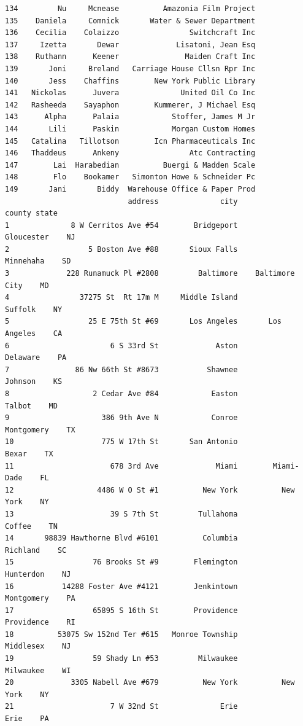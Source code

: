 \documentclass[
  12pt,
]{article}
\begin{document}
\begin{verbatim}
134         Nu     Mcnease          Amazonia Film Project
135    Daniela     Comnick       Water & Sewer Department
136    Cecilia    Colaizzo                Switchcraft Inc
137     Izetta       Dewar             Lisatoni, Jean Esq
138    Ruthann      Keener               Maiden Craft Inc
139       Joni     Breland   Carriage House Cllsn Rpr Inc
140       Jess    Chaffins        New York Public Library
141   Nickolas      Juvera              United Oil Co Inc
142   Rasheeda    Sayaphon        Kummerer, J Michael Esq
143      Alpha      Palaia            Stoffer, James M Jr
144       Lili      Paskin            Morgan Custom Homes
145   Catalina   Tillotson        Icn Pharmaceuticals Inc
146   Thaddeus      Ankeny                Atc Contracting
147        Lai  Harabedian          Buergi & Madden Scale
148        Flo    Bookamer   Simonton Howe & Schneider Pc
149       Jani       Biddy  Warehouse Office & Paper Prod
                            address              city            county state
1              8 W Cerritos Ave #54        Bridgeport        Gloucester    NJ
2                  5 Boston Ave #88       Sioux Falls         Minnehaha    SD
3             228 Runamuck Pl #2808         Baltimore    Baltimore City    MD
4                37275 St  Rt 17m M     Middle Island           Suffolk    NY
5                  25 E 75th St #69       Los Angeles       Los Angeles    CA
6                       6 S 33rd St             Aston          Delaware    PA
7               86 Nw 66th St #8673           Shawnee           Johnson    KS
8                   2 Cedar Ave #84            Easton            Talbot    MD
9                     386 9th Ave N            Conroe        Montgomery    TX
10                    775 W 17th St       San Antonio             Bexar    TX
11                      678 3rd Ave             Miami        Miami-Dade    FL
12                   4486 W O St #1          New York          New York    NY
13                      39 S 7th St         Tullahoma            Coffee    TN
14       98839 Hawthorne Blvd #6101          Columbia          Richland    SC
15                  76 Brooks St #9        Flemington         Hunterdon    NJ
16           14288 Foster Ave #4121        Jenkintown        Montgomery    PA
17                  65895 S 16th St        Providence        Providence    RI
18          53075 Sw 152nd Ter #615   Monroe Township         Middlesex    NJ
19                  59 Shady Ln #53         Milwaukee         Milwaukee    WI
20             3305 Nabell Ave #679          New York          New York    NY
21                      7 W 32nd St              Erie              Erie    PA

\end{verbatim}
\end{document}
